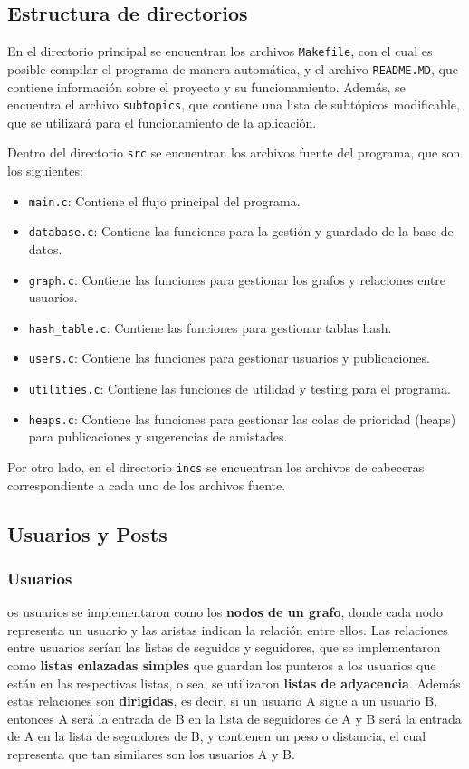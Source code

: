 \documentclass[9pt,letterpaper,onecolumn]{rho-class/rho}
\begin{document}
\subsection{Estructura de directorios}
En el directorio principal se encuentran los archivos \texttt{Makefile}, con el cual es posible compilar el programa de manera automática, y el archivo \texttt{README.MD}, que contiene información sobre el proyecto y su funcionamiento. Además, se encuentra el archivo \texttt{subtopics}, que contiene una lista de subtópicos modificable, que se utilizará para el funcionamiento de la aplicación.

\vspace{0.5cm}

Dentro del directorio \texttt{src} se encuentran los archivos fuente del programa, que son los siguientes:
\begin{itemize}
	\item \texttt{main.c}: Contiene el flujo principal del programa.
	\item \texttt{database.c}: Contiene las funciones para la gestión y guardado de la base de datos.
	\item \texttt{graph.c}: Contiene las funciones para gestionar los grafos y relaciones entre usuarios.
	\item \texttt{hash\_table.c}: Contiene las funciones para gestionar tablas hash.
	\item \texttt{users.c}: Contiene las funciones para gestionar usuarios y publicaciones.
	\item \texttt{utilities.c}: Contiene las funciones de utilidad y testing para el programa.
	\item \texttt{heaps.c}: Contiene las funciones para gestionar las colas de prioridad (heaps) para publicaciones y sugerencias de amistades.
\end{itemize}

Por otro lado, en el directorio \texttt{incs} se encuentran los archivos de cabeceras correspondiente a cada uno de los archivos fuente.


\subsection{Usuarios y Posts}
\subsubsection{Usuarios}
os usuarios se implementaron como los \textbf{nodos de un grafo}, donde cada nodo representa un usuario y las aristas indican la relación entre ellos. Las relaciones entre usuarios serían las listas de seguidos y seguidores, que se implementaron como \textbf{listas enlazadas simples} que guardan los punteros a los usuarios que están en las respectivas listas, o sea, se utilizaron \textbf{listas de adyacencia}. Además estas relaciones son \textbf{dirigidas}, es decir, si un usuario A sigue a un usuario B, entonces A será la entrada de B en la lista de seguidores de A y B será la entrada de A en la lista de seguidores de B, y contienen un peso o distancia, el cual representa que tan similares son los usuarios A y B.
\end{document}
